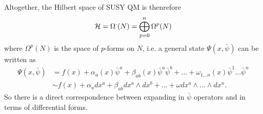 Altogether, the Hilbert space of SUSY QM is thenrefore
\begin{equation}
    \mathcal H = \Omega^\cdot (N)=\bigoplus_{p=0}^n \Omega^p(N)
\end{equation}
where $\Omega^p(N)$ is the space of $p$-forms on $N$, i.e. a general state $\Psi(x,\bar \psi)$ can be written as
\begin{align}
    \Psi(x,\bar \psi)&=f(x) + \alpha_a(x) \bar \psi^a + \beta_{ab}(x) \bar \psi^a \bar \psi^b +\ldots + \omega_{1\ldots n}(x) \bar \psi^1 \ldots \bar \psi^n\\
    &\sim f(x) + \alpha_a dx^a + \beta_{ab} dx^a \wedge dx^b + \ldots + \omega dx^a \wedge \ldots \wedge dx^n.
\end{align}
So there is a direct correspondence between expanding in $\bar \psi$ operators and in terms of differential forms.


